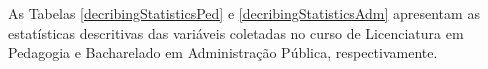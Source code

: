 \begin{figure}[!htb]
  \vspace{1.5em}
  \Ididthis
\end{figure}

As Tabelas \ref{decribingStatisticsPed} e \ref{decribingStatisticsAdm}
apresentam as estatísticas descritivas das variáveis coletadas no curso de
Licenciatura em Pedagogia e Bacharelado em Administração Pública,
respectivamente.

